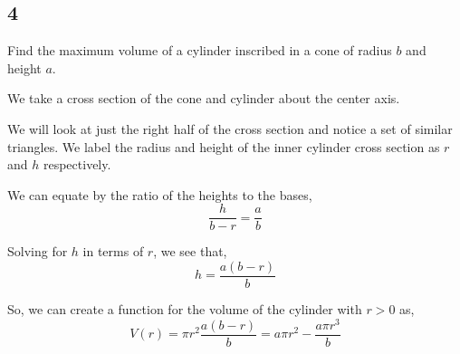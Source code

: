 \documentclass[../hw4.tex]{subfiles}
\begin{document}
\subsection*{4}
Find the maximum volume of a cylinder inscribed in a cone of radius $b$ and height $a$.

We take a cross section of the cone and cylinder about the center axis.

\begin{figure*}[ht]
\centering
{}  
\end{figure*}

We will look at just the right half of the cross section and notice a set of similar triangles. We label the radius and height of the inner cylinder cross section as $r$ and $h$ respectively.

\begin{figure*}[ht]
\centering
{}
\end{figure*}
  
We can equate by the ratio of the heights to the bases,
\[\frac{h}{b-r} = \frac{a}{b}\]

Solving for $h$ in terms of $r$, we see that,
\[h = \frac{a(b-r)}{b}\]

So, we can create a function for the volume of the cylinder with $r>0$ as,
\[V(r) = \pi r^2 \frac{a(b-r)}{b} = a\pi r^2 - \frac{a \pi r^3}{b}\]
\end{document}
